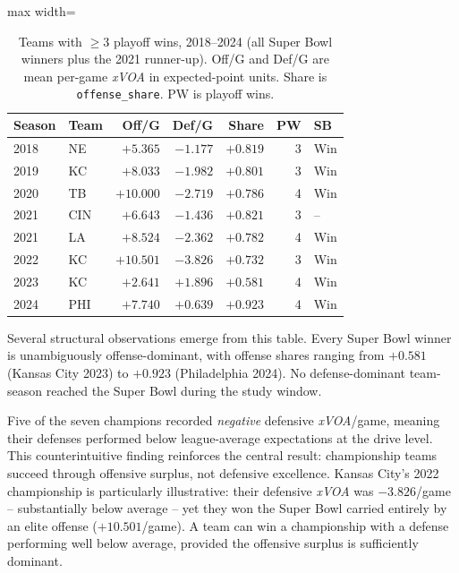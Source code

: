 \documentclass[12pt,a4paper]{article}
\newcommand{\xvoa}{\textit{xVOA}}
\begin{document}
\begin{table}[htbp]
  \centering
  \caption{Teams with $\geq 3$ playoff wins, 2018--2024 (all Super Bowl
           winners plus the 2021 runner-up). Off/G and Def/G are mean
           per-game \xvoa{} in expected-point units. Share is
           \texttt{offense\_share}. PW is playoff wins.}
  \label{tab:sb-participants}
  \begin{adjustbox}{max width=\textwidth}
  \begin{tabular}{llrrrrl}
    \toprule
    \textbf{Season} & \textbf{Team}
      & \textbf{Off/G} & \textbf{Def/G}
      & \textbf{Share} & \textbf{PW} & \textbf{SB} \\
    \midrule
    2018 & NE  & $+5.365$ & $-1.177$ & $+0.819$ & 3 & Win \\
    2019 & KC  & $+8.033$ & $-1.982$ & $+0.801$ & 3 & Win \\
    2020 & TB  & $+10.000$ & $-2.719$ & $+0.786$ & 4 & Win \\
    2021 & CIN & $+6.643$ & $-1.436$ & $+0.821$ & 3 &  -- \\
    2021 & LA  & $+8.524$ & $-2.362$ & $+0.782$ & 4 & Win \\
    2022 & KC  & $+10.501$ & $-3.826$ & $+0.732$ & 3 & Win \\
    2023 & KC  & $+2.641$ & $+1.896$ & $+0.581$ & 4 & Win \\
    2024 & PHI & $+7.740$ & $+0.639$ & $+0.923$ & 4 & Win \\
    \bottomrule
  \end{tabular}
  \end{adjustbox}
\end{table}

Several structural observations emerge from this table. Every Super Bowl winner is unambiguously offense-dominant, with offense shares ranging from $+0.581$ (Kansas City 2023) to $+0.923$ (Philadelphia 2024). No defense-dominant team-season reached the Super Bowl during the study window.

Five of the seven champions recorded \emph{negative} defensive \xvoa{}/game, meaning their defenses performed below league-average expectations at the drive level. This counterintuitive finding reinforces the central result: championship teams succeed through offensive surplus, not defensive excellence. Kansas City's 2022 championship is particularly illustrative: their defensive \xvoa{} was $-3.826$/game -- substantially below average -- yet they won the Super Bowl carried entirely by an elite offense ($+10.501$/game). A team can win a championship with a defense performing well below average, provided the offensive surplus is sufficiently dominant.
\end{document}
